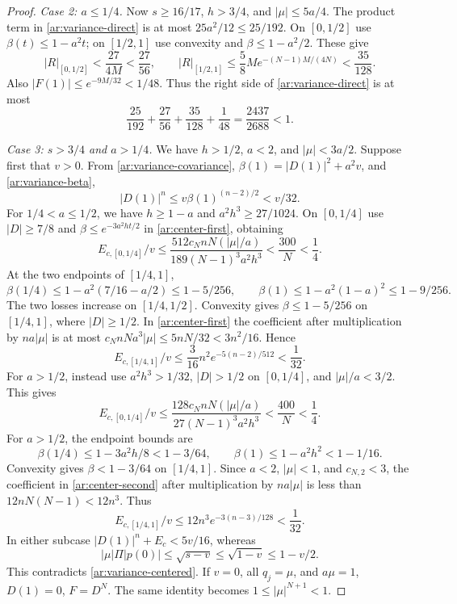 \documentclass[11pt,reqno]{amsart}
\numberwithin{equation}{section}
\theoremstyle{definition}
\theoremstyle{remark}
\begin{document}
\begin{proof}
\smallskip
\noindent\emph{Case 2: $a\le1/4$.}
Now $s\ge16/17$, $h>3/4$, and $|\mu|\le5a/4$.
The product term in \eqref{ar:variance-direct} is at most
$25a^2/12\le25/192$. On $[0,1/2]$ use
$\beta(t)\le1-a^2t$; on $[1/2,1]$ use convexity and
$\beta\le1-a^2/2$. These give
\[
 |R|_{[0,1/2]}<\frac{27}{4M}<\frac{27}{56},
 \qquad
 |R|_{[1/2,1]}\le\frac58M e^{-(N-1)M/(4N)}<\frac{35}{128}.
\]
Also $|F(1)|\le e^{-9M/32}<1/48$. Thus the right side of
\eqref{ar:variance-direct} is at most
\[
 \frac{25}{192}+\frac{27}{56}+\frac{35}{128}+\frac1{48}
 =\frac{2437}{2688}<1.
\]

\smallskip
\noindent\emph{Case 3: $s>3/4$ and $a>1/4$.}
We have $h>1/2$, $a<2$, and $|\mu|<3a/2$.
Suppose first that $v>0$. From
\eqref{ar:variance-covariance}, $\beta(1)=|D(1)|^2+a^2v$, and
\eqref{ar:variance-beta},
\[
 |D(1)|^n\le v\beta(1)^{(n-2)/2}<v/32.
\]
For $1/4<a\le1/2$, we have $h\ge1-a$ and
$a^2h^3\ge27/1024$. On $[0,1/4]$ use
$|D|\ge7/8$ and $\beta\le e^{-3a^2ht/2}$ in
\eqref{ar:center-first}, obtaining
\[
 E_{c,[0,1/4]}/v
 \le\frac{512c_NnN(|\mu|/a)}{189(N-1)^3a^2h^3}
 <\frac{300}{N}<\frac14.
\]
At the two endpoints of $[1/4,1]$,
\[
 \beta(1/4)\le1-a^2(7/16-a/2)\le1-5/256,
 \qquad
 \beta(1)\le1-a^2(1-a)^2\le1-9/256.
\]
The two losses increase on $[1/4,1/2]$. Convexity gives
$\beta\le1-5/256$ on $[1/4,1]$, where $|D|\ge1/2$.
In \eqref{ar:center-first} the coefficient after multiplication by
$na|\mu|$ is at most
$c_NnNa^3|\mu|\le5nN/32<3n^2/16$. Hence
\[
 E_{c,[1/4,1]}/v\le\frac3{16}n^2e^{-5(n-2)/512}<\frac1{32}.
\]
For $a>1/2$, instead use $a^2h^3>1/32$, $|D|>1/2$ on
$[0,1/4]$, and $|\mu|/a<3/2$. This gives
\[
 E_{c,[0,1/4]}/v
 \le\frac{128c_NnN(|\mu|/a)}{27(N-1)^3a^2h^3}
 <\frac{400}{N}<\frac14.
\]
For $a>1/2$, the endpoint bounds are
\[
 \beta(1/4)\le1-3a^2h/8<1-3/64,\qquad
 \beta(1)\le1-a^2h^2<1-1/16.
\]
Convexity gives $\beta<1-3/64$ on $[1/4,1]$.
Since $a<2$, $|\mu|<1$, and $c_{N,2}<3$, the coefficient in
\eqref{ar:center-second} after multiplication by $na|\mu|$ is
less than $12nN(N-1)<12n^3$. Thus
\[
 E_{c,[1/4,1]}/v\le12n^3e^{-3(n-3)/128}<\frac1{32}.
\]
In either subcase $|D(1)|^n+E_c<5v/16$, whereas
\[
 |\mu|\Pi|p(0)|\le\sqrt{s-v}\le\sqrt{1-v}\le1-v/2.
\]
This contradicts \eqref{ar:variance-centered}.
If $v=0$, all $q_j=\mu$, and $a\mu=1$, $D(1)=0$, $F=D^N$.
The same identity becomes $1\le|\mu|^{N+1}<1$.


\end{proof}
\end{document}
